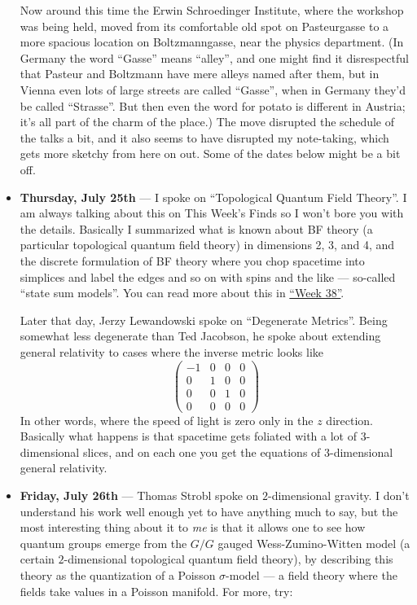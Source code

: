\documentclass{article}
\begin{document}
\begin{itemize}
  Now around this time the Erwin Schroedinger Institute, where the
  workshop was being held, moved from its comfortable old spot on
  Pasteurgasse to a more spacious location on Boltzmanngasse, near the
  physics department. (In Germany the word ``Gasse'' means ``alley'',
  and one might find it disrespectful that Pasteur and Boltzmann have
  mere alleys named after them, but in Vienna even lots of large streets
  are called ``Gasse'', when in Germany they'd be called ``Strasse''.
  But then even the word for potato is different in Austria; it's all
  part of the charm of the place.) The move disrupted the schedule of
  the talks a bit, and it also seems to have disrupted my note-taking,
  which gets more sketchy from here on out. Some of the dates below
  might be a bit off.
\item
  \textbf{Thursday, July 25th} --- I spoke on ``Topological Quantum
  Field Theory''. I am always talking about this on This Week's Finds so
  I won't bore you with the details. Basically I summarized what is
  known about BF theory (a particular topological quantum field theory)
  in dimensions 2, 3, and 4, and the discrete formulation of BF theory
  where you chop spacetime into simplices and label the edges and so on
  with spins and the like --- so-called ``state sum models''. You can
  read more about this in \protect\hyperlink{week38}{``Week 38''}.

  Later that day, Jerzy Lewandowski spoke on ``Degenerate Metrics''.
  Being somewhat less degenerate than Ted Jacobson, he spoke about
  extending general relativity to cases where the inverse metric looks
  like \[
      \left(
        \begin{array}{cccc}
          -1&0&0&0
        \\0&1&0&0
        \\0&0&1&0
        \\0&0&0&0
        \end{array}
      \right)
    \] In other words, where the speed of light is zero only in the
  \(z\) direction. Basically what happens is that spacetime gets
  foliated with a lot of \(3\)-dimensional slices, and on each one you
  get the equations of \(3\)-dimensional general relativity.
\item
  \textbf{Friday, July 26th} --- Thomas Strobl spoke on
  \(2\)-dimensional gravity. I don't understand his work well enough yet
  to have anything much to say, but the most interesting thing about it
  to \emph{me} is that it allows one to see how quantum groups emerge
  from the \(G/G\) gauged Wess-Zumino-Witten model (a certain
  \(2\)-dimensional topological quantum field theory), by describing
  this theory as the quantization of a Poisson \(\sigma\)-model --- a
  field theory where the fields take values in a Poisson manifold. For
  more, try:


\end{itemize}
\end{document}
